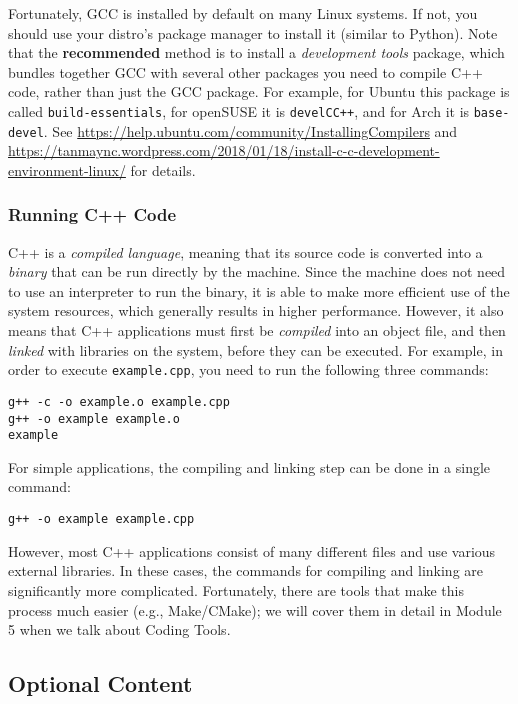 \documentclass[12pt]{article}
\begin{document}
Fortunately, GCC is installed by default on many Linux systems. If not, you should use your distro's package manager to install it (similar to Python). Note that the \textbf{recommended} method is to install a \emph{development tools} package, which bundles together GCC with several other packages you need to compile C++ code, rather than just the GCC package. For example, for Ubuntu this package is called \texttt{build-essentials}, for openSUSE it is \texttt{devel\ttul C\ttul C++}, and for Arch it is \texttt{base-devel}. See \url{https://help.ubuntu.com/community/InstallingCompilers} and \url{https://tanmaync.wordpress.com/2018/01/18/install-c-c-development-environment-linux/} for details.

\subsubsection{Running C++ Code}
C++ is a \emph{compiled language}, meaning that its source code is converted into a \emph{binary} that can be run directly by the machine. Since the machine does not need to use an interpreter to run the binary, it is able to make more efficient use of the system resources, which generally results in higher performance. However, it also means that C++ applications must first be \emph{compiled} into an object file, and then \emph{linked} with libraries on the system, before they can be executed. For example, in order to execute \texttt{example.cpp}, you need to run the following three commands:
\begin{verbatim}
g++ -c -o example.o example.cpp
g++ -o example example.o
example
\end{verbatim}
For simple applications, the compiling and linking step can be done in a single command:
\begin{verbatim}
g++ -o example example.cpp
\end{verbatim}
However, most C++ applications consist of many different files and use various external libraries. In these cases, the commands for compiling and linking are significantly more complicated. Fortunately, there are tools that make this process much easier (e.g., Make/CMake); we will cover them in detail in Module 5 when we talk about Coding Tools.



\subsection{Optional Content}
\end{document}
